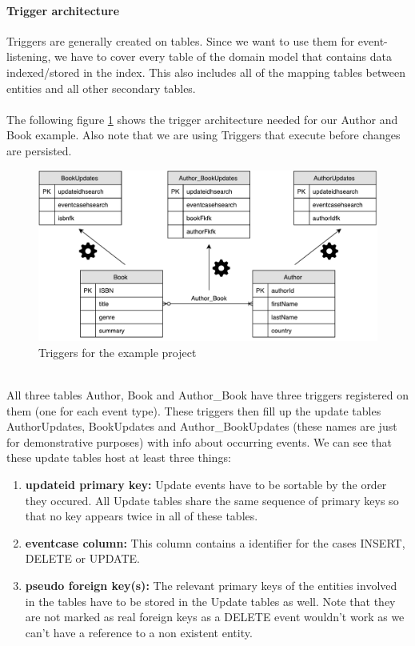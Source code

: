 \pagebreak

\paragraph{Trigger architecture}

Triggers are generally created on tables. Since we want to use them for event-listening, we have to cover every table of the domain model that contains data indexed/stored in the index. This also includes all of the mapping tables between entities and all other secondary tables.
\\\\
The following figure \ref{triggers_schema} shows the trigger architecture needed for our Author and Book example. Also note that we are using Triggers that execute before changes are persisted.
\\
\begin{figure}[ht]
	\centering
	\includegraphics[scale=0.6]{images/Triggers_Schema.pdf}
	\caption{Triggers for the example project}
	\label{triggers_schema}
\end{figure}
\\
\noindent
All three tables Author, Book and Author\_Book have three triggers registered on them (one for each event type). These triggers then fill up the update tables AuthorUpdates, BookUpdates and Author\_BookUpdates (these names are just for demonstrative purposes) with info about occurring events. We can see that these update tables host at least three things:

\begin{enumerate}
	\item \textbf{updateid primary key:} Update events have to be sortable by the order they occured. All Update tables share the same sequence of primary keys so that no key appears twice in all of these tables.
	\item \textbf{eventcase column:} This column contains a identifier for the cases INSERT, DELETE or UPDATE.
	\item \textbf{pseudo foreign key(s):} The relevant primary keys of the entities involved in the tables have to be stored in the Update tables as well. Note that they are not marked as real foreign keys as a DELETE event wouldn't work as we can't have a reference to a non existent entity.
\end{enumerate}

